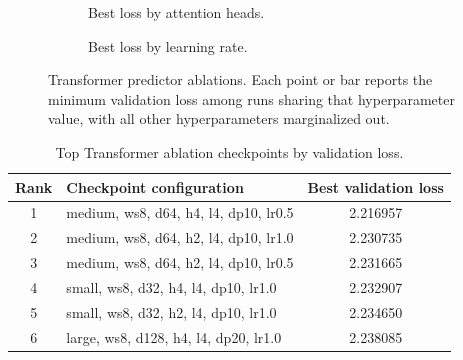 \documentclass[11pt]{article}
\begin{document}
\begin{figure}[!htbp]
  \vspace{0.35cm}
  \begin{subfigure}{0.46\linewidth}
    \centering
    \caption{Best loss by attention heads.}
  \end{subfigure}
  \hfill
  \begin{subfigure}{0.46\linewidth}
    \centering
    \caption{Best loss by learning rate.}
  \end{subfigure}
  \caption{Transformer predictor ablations. Each point or bar reports the minimum validation loss among runs sharing that hyperparameter value, with all other hyperparameters marginalized out.}
  \label{fig:transformer-ablation-grid}
\end{figure}

\begin{table}[t!]
  \centering
  \caption{Top Transformer ablation checkpoints by validation loss.}
  \label{tab:top-ablation-runs}
  \footnotesize
  \begin{tabular}{@{}clc@{}}
    \toprule
    Rank & Checkpoint configuration & Best validation loss \\
    \midrule
    1 & medium, ws8, d64, h4, l4, dp10, lr0.5 & 2.216957 \\
    2 & medium, ws8, d64, h2, l4, dp10, lr1.0 & 2.230735 \\
    3 & medium, ws8, d64, h2, l4, dp10, lr0.5 & 2.231665 \\
    4 & small, ws8, d32, h4, l4, dp10, lr1.0 & 2.232907 \\
    5 & small, ws8, d32, h2, l4, dp10, lr1.0 & 2.234650 \\
    6 & large, ws8, d128, h4, l4, dp20, lr1.0 & 2.238085 \\
    \bottomrule
  \end{tabular}
\end{table}
\end{document}
